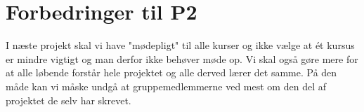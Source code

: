\section{Forbedringer til P2}
I næste projekt skal vi have "mødepligt" til alle kurser og ikke vælge at ét kursus er mindre vigtigt og man derfor ikke behøver møde op. Vi skal også gøre mere for at alle løbende forstår hele projektet og alle derved lærer det samme. På den måde kan vi måske undgå at gruppemedlemmerne ved mest om den del af projektet de selv har skrevet. 
